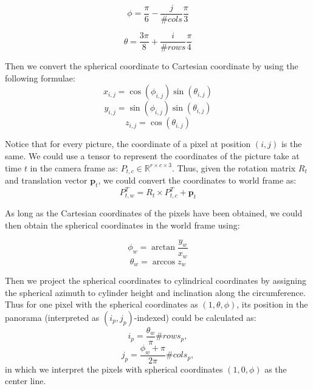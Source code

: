 \documentclass[conference]{IEEEtran}
\begin{document}
\begin{equation}
    \phi = \frac{\pi}{6} - \frac{j}{\#cols} \frac{\pi}{3}
\end{equation}

\begin{equation}
    \theta = \frac{3\pi}{8} + \frac{i}{\#rows} \frac{\pi}{4}
\end{equation}

Then we convert the spherical coordinate to Cartesian coordinate by using the following formulae:
\begin{equation}
    x_{i, j} = \cos(\phi_{i, j})\sin(\theta_{i, j})
\end{equation}
\begin{equation}
    y_{i, j} = \sin(\phi_{i, j})\sin(\theta_{i, j})
\end{equation}
\begin{equation}
    z_{i, j} = \cos(\theta_{i, j})
\end{equation}

Notice that for every picture, the coordinate of a pixel at position $(i, j)$ is the same. We could
use a tensor to represent the coordinates of the picture take at time $t$ in the camera frame as:
$P_{t, c} \in \mathbb{R}^{r \times c \times 3}$.
Thus, given the rotation matrix $R_t$ and translation vector $\boldsymbol{p}_t$, we could convert the coordinates to
world frame as:
\begin{equation}
    P_{t, w}^T = R_t \times P_{t, c}^T + \boldsymbol{p}_t
\end{equation}

As long as the Cartesian coordinates of the pixels have been obtained, we could then obtain the spherical
coordinates in the world frame using:

\begin{equation}
    \phi_w = \arctan\frac{y_w}{x_w}
\end{equation}
\begin{equation}
    \theta_w = \arccos z_w
\end{equation}

Then we project the spherical coordinates to cylindrical coordinates by assigning the spherical azimuth to cylinder height
and inclination along the circumference. Thus for one pixel with the spherical coordinates as $(1, \theta, \phi)$, its position
in the panorama (interpreted as $(i_p, j_p)$-indexed) could be calculated as:
\begin{equation}
    i_p = \frac{\theta_w}{\pi} \#rows_p,
\end{equation}
\begin{equation}
    j_p = \frac{\phi_w + \pi}{2\pi} \#cols_p,
\end{equation}
in which we interpret the pixels with spherical coordinates $(1, 0, \phi)$ as the center line.
\end{document}
